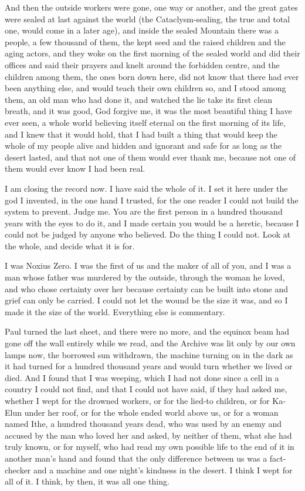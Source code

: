 And then the outside workers were gone, one way or another, and the great gates were sealed at last against the world (the Cataclysm-sealing, the true and total one, would come in a later age), and inside the sealed Mountain there was a people, a few thousand of them, the kept seed and the raised children and the aging actors, and they woke on the first morning of the sealed world and did their offices and said their prayers and knelt around the forbidden centre, and the children among them, the ones born down here, did not know that there had ever been anything else, and would teach their own children so, and I stood among them, an old man who had done it, and watched the lie take its first clean breath, and it was good, God forgive me, it was the most beautiful thing I have ever seen, a whole world believing itself eternal on the first morning of its life, and I knew that it would hold, that I had built a thing that would keep the whole of my people alive and hidden and ignorant and safe for as long as the desert lasted, and that not one of them would ever thank me, because not one of them would ever know I had been real.\par

I am closing the record now. I have said the whole of it. I set it here under the god I invented, in the one hand I trusted, for the one reader I could not build the system to prevent. Judge me. You are the first person in a hundred thousand years with the eyes to do it, and I made certain you would be a heretic, because I could not be judged by anyone who believed. Do the thing I could not. Look at the whole, and decide what it is for.\par

I was Noxius Zero. I was the first of us and the maker of all of you, and I was a man whose father was murdered by the outside, through the woman he loved, and who chose certainty over her because certainty can be built into stone and grief can only be carried. I could not let the wound be the size it was, and so I made it the size of the world. Everything else is commentary.\par

\ornament

Paul turned the last sheet, and there were no more, and the equinox beam had gone off the wall entirely while we read, and the Archive was lit only by our own lamps now, the borrowed sun withdrawn, the machine turning on in the dark as it had turned for a hundred thousand years and would turn whether we lived or died. And I found that I was weeping, which I had not done since a cell in a country I could not find, and that I could not have said, if they had asked me, whether I wept for the drowned workers, or for the lied-to children, or for Ka-Elun under her roof, or for the whole ended world above us, or for a woman named Ithe, a hundred thousand years dead, who was used by an enemy and accused by the man who loved her and asked, by neither of them, what she had truly known, or for myself, who had read my own possible life to the end of it in another man's hand and found that the only difference between us was a fact-checker and a machine and one night's kindness in the desert. I think I wept for all of it. I think, by then, it was all one thing.\par
